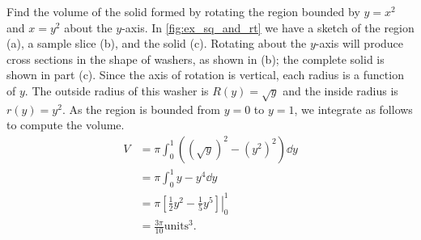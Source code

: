 \begin{example}\label{ex_wash_3}%
Find the volume of the solid formed by rotating the region bounded by $y=x^2$ and $x=y^2$ about the $y$-axis.
\solution
In \autoref{fig:ex_sq_and_rt} we have a sketch of the region (a), a sample slice (b), and the solid (c). Rotating about the $y$-axis will produce cross sections in the shape of washers, as shown in (b); the complete solid is shown in  part (c). Since the axis of rotation is vertical, each radius is a function of $y$. The outside radius of this washer is $R(y)=\sqrt y$ and the inside radius is $r(y)=y^2$. As the region is bounded from $y=0$ to $y=1$, we integrate as follows to compute the volume. 
\begin{align*}
V&=\pi \int_0^1 \left((\sqrt y)^2-(y^2)^2\right) \dd y\\
&=\pi \int_0^1 y-y^4 \dd y\\
&=\pi\left.\left[\frac{1}{2} y^2-\frac{1}{5} y^5\right] \right|_0^1\\
&=\frac{3\pi}{10} \text{units}^3.
\end{align*}
\end{example}

